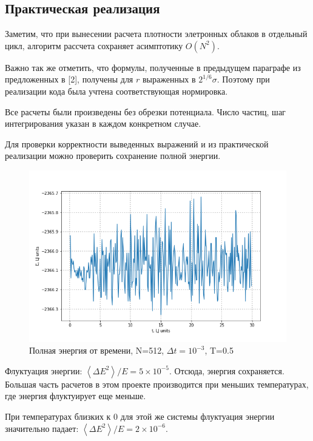 \documentclass[12pt]{article}
\begin{document}
\subsection{Практическая реализация}
Заметим, что при вынесении расчета плотности элетронных облаков в отдельный цикл, алгоритм рассчета сохраняет асимптотику $O(N^2)$. 

Важно так же отметить, что формулы, полученные в предыдущем параграфе из предложенных в [2], получены для $r$ выраженных в $2^{1/6} \sigma$. Поэтому при реализации кода была учтена соответствующая нормировка.

Все расчеты были произведены без обрезки потенциала. Число частиц, шаг интегрирования указан в каждом конкретном случае.

Для проверки корректности выведенных выражений и из практической реализации можно проверить сохранение полной энергии.

\begin{figure}[h]
\centering
\includegraphics[width=1.0\textwidth]{energy5}
\caption{Полная энергия от времени, N=512, $\Delta t = 10^{-3}$, T=0.5}
\end{figure}
\FloatBarrier

Флуктуация энергии: $\left\langle \Delta E^2 \right\rangle /E = 5\times 10^{-5}$. Отсюда, энергия сохраняется. Большая часть расчетов в этом проекте производится при меньших температурах, где энергия флуктуирует еще меньше.

При температурах близких к 0 для этой же системы флуктуация энергии значительно падает: $\left\langle \Delta E^2 \right\rangle /E = 2\times 10^{-6}$.
 
\end{document}
